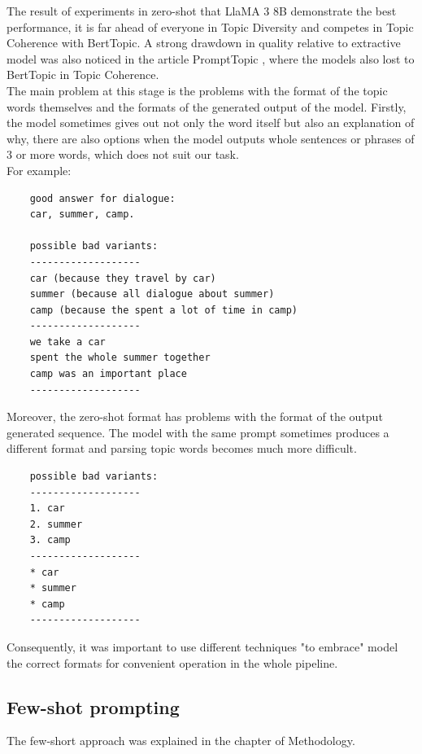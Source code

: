 \documentclass[PMI,VKR]{HSEUniversity}
\begin{document}
The result of experiments in zero-shot that LlaMA 3 8B demonstrate the best performance, it is far ahead of everyone in Topic Diversity and competes in Topic Coherence with BertTopic. 
A strong drawdown in quality relative to extractive model was also noticed in the article PromptTopic \cite{prompttopic:2023}, where the models also lost to BertTopic in Topic Coherence. \\

The main problem at this stage is the problems with the format of the topic words themselves and the formats of the generated output of the model. 
Firstly, the model sometimes gives out not only the word itself but also an explanation of why, there are also options when the model outputs whole sentences or phrases of 3 or more words, which does not suit our task. \\
For example:

\begin{lstlisting}
    good answer for dialogue: 
    car, summer, camp.   
    
    possible bad variants:
    -------------------
    car (because they travel by car)
    summer (because all dialogue about summer)
    camp (because the spent a lot of time in camp)
    -------------------
    we take a car
    spent the whole summer together
    camp was an important place
    -------------------
\end{lstlisting}


Moreover, the zero-shot format has problems with the format of the output generated sequence. 
The model with the same prompt sometimes produces a different format and parsing topic words becomes much more difficult.

\begin{lstlisting}
    possible bad variants:
    -------------------    
    1. car
    2. summer
    3. camp
    -------------------
    * car
    * summer
    * camp
    -------------------
\end{lstlisting}

Consequently, it was important to use different techniques "to embrace" model the correct formats for convenient operation in the whole pipeline.

\subsection{Few-shot prompting}

The few-short approach was explained in the chapter of Methodology.
\end{document}
